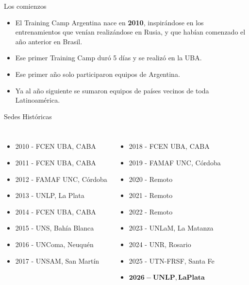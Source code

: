 \documentclass{beamer}
\begin{document}
\begin{frame}{Los comienzos}
    \begin{itemize}
        \item El Training Camp Argentina nace en \textbf{2010}, inspirándose en los entrenamientos que venían realizándose en Rusia, y que habían comenzado el año anterior en Brasil.
        \item Ese primer Training Camp duró 5 días y se realizó en la UBA.
        \item Ese primer año solo participaron equipos de Argentina.
        \item Ya al año siguiente se sumaron equipos de países vecinos de toda Latinoamérica.
    \end{itemize}
\end{frame}

\begin{frame}{Sedes Históricas}
    \begin{columns}
        \small
        \begin{itemize}
            \item 2010 - FCEN UBA, CABA
            \item 2011 - FCEN UBA, CABA
            \item 2012 - FAMAF UNC, Córdoba
            \item 2013 - UNLP, La Plata
            \item 2014 - FCEN UBA, CABA
            \item 2015 - UNS, Bahía Blanca
            \item 2016 - UNComa, Neuquén
            \item 2017 - UNSAM, San Martín
        \end{itemize}
        \small
        \begin{itemize}
            \item 2018 - FCEN UBA, CABA
            \item 2019 - FAMAF UNC, Córdoba
            \item 2020 - Remoto
            \item 2021 - Remoto
            \item 2022 - Remoto
            \item 2023 - UNLaM, La Matanza
            \item 2024 - UNR, Rosario
            \item 2025 - UTN-FRSF, Santa Fe
            \item $\bm{2026 - UNLP, La Plata}$
        \end{itemize}
    \end{columns}
\end{frame}
\end{document}
